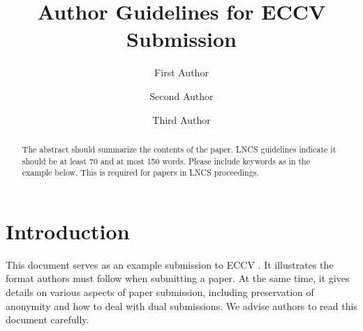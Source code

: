 \documentclass[runningheads]{llncs}
\begin{document}
\title{Author Guidelines for ECCV Submission} 


\author{First Author \and
Second Author \and
Third Author}



\maketitle


\begin{abstract}
  The abstract should summarize the contents of the paper. 
  LNCS guidelines indicate it should be at least 70 and at most 150 words.
  Please include keywords as in the example below. 
  This is required for papers in LNCS proceedings.
\end{abstract}


\section{Introduction}
\label{sec:intro}

This document serves as an example submission to ECCV \ECCVyear{}.
It illustrates the format authors must follow when submitting a paper. 
At the same time, it gives details on various aspects of paper submission, including preservation of anonymity and how to deal with dual submissions.
We advise authors to read this document carefully.
\end{document}
